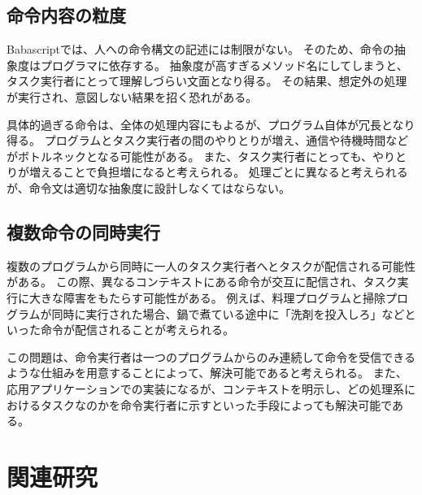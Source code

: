 \documentclass[twoside]{wiss}
\begin{document}
\subsection{命令内容の粒度}

Babascriptでは、人への命令構文の記述には制限がない。
そのため、命令の抽象度はプログラマに依存する。
抽象度が高すぎるメソッド名にしてしまうと、タスク実行者にとって理解しづらい文面となり得る。
その結果、想定外の処理が実行され、意図しない結果を招く恐れがある。

具体的過ぎる命令は、全体の処理内容にもよるが、プログラム自体が冗長となり得る。
プログラムとタスク実行者の間のやりとりが増え、通信や待機時間などがボトルネックとなる可能性がある。
また、タスク実行者にとっても、やりとりが増えることで負担増になると考えられる。
処理ごとに異なると考えられるが、命令文は適切な抽象度に設計しなくてはならない。


\subsection{複数命令の同時実行}

複数のプログラムから同時に一人のタスク実行者へとタスクが配信される可能性がある。
この際、異なるコンテキストにある命令が交互に配信され、タスク実行に大きな障害をもたらす可能性がある。
例えば、料理プログラムと掃除プログラムが同時に実行された場合、鍋で煮ている途中に「洗剤を投入しろ」などといった命令が配信されることが考えられる。

この問題は、命令実行者は一つのプログラムからのみ連続して命令を受信できるような仕組みを用意することによって、解決可能であると考えられる。
また、応用アプリケーションでの実装になるが、コンテキストを明示し、どの処理系におけるタスクなのかを命令実行者に示すといった手段によっても解決可能である。

\section{関連研究}
\end{document}
